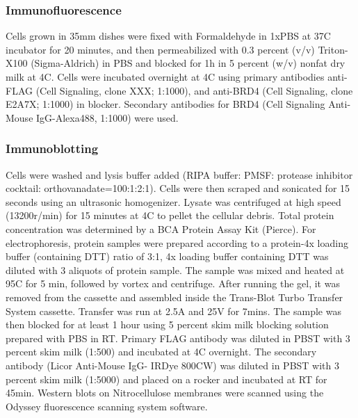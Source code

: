 \subsubsection{Immunofluorescence}
Cells grown in 35mm dishes were fixed with Formaldehyde in 1xPBS at 37C incubator for 20 minutes, and then permeabilized with 0.3 percent (v/v) Triton-X100 (Sigma-Aldrich) in PBS and blocked for 1h in 5 percent (w/v) nonfat dry milk at 4C. Cells were incubated overnight at 4C using primary antibodies anti-FLAG (Cell Signaling, clone XXX; 1:1000), and anti-BRD4 (Cell Signaling, clone E2A7X; 1:1000)  in blocker. Secondary antibodies for BRD4 (Cell Signaling Anti-Mouse IgG-Alexa488, 1:1000) were used. 

\subsubsection{Immunoblotting}
Cells were washed and lysis buffer added (RIPA buffer: PMSF: protease inhibitor cocktail: orthovanadate=100:1:2:1). Cells were then scraped and sonicated for 15 seconds using an ultrasonic homogenizer. Lysate was centrifuged at high speed (13200r/min) for 15 minutes at 4C to pellet the cellular debris. Total protein concentration was determined by a BCA Protein Assay Kit (Pierce). For electrophoresis, protein samples were prepared according to a protein-4x loading buffer (containing DTT) ratio of 3:1, 4x loading buffer containing DTT was diluted with 3 aliquots of protein sample. The sample was mixed and heated at 95C for 5 min, followed by vortex and centrifuge. After running the gel, it was removed from the cassette and assembled inside the Trans-Blot Turbo Transfer System cassette. Transfer was run at 2.5A and 25V for 7mins. The sample was then blocked for at least 1 hour using 5 percent skim milk blocking solution prepared with PBS in RT. Primary FLAG antibody was diluted in PBST with 3 percent skim milk (1:500) and incubated at 4C overnight. The secondary antibody (Licor Anti-Mouse IgG- IRDye 800CW) was diluted in PBST with 3 percent skim milk (1:5000) and placed on a rocker and incubated at RT for 45min. Western blots on Nitrocellulose membranes were scanned using the Odyssey fluorescence scanning system software.

